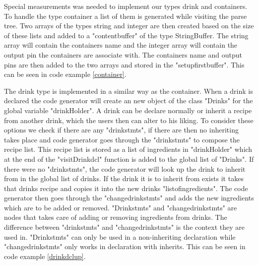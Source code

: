 
Special measurements was needed to implement our types drink and containers. To handle the type container a list of them is generated while visiting the parse tree. Two arrays of the types string and integer are then created based on the size of these lists and added to a "contentbuffer" of the type StringBuffer. The string array will contain the containers name and the integer array will contain the output pin the containers are associate with. The containers name and output pins are then added to the two arrays and stored in the "setupfirstbuffer". This can be seen in code example \ref{container}.


The drink type is implemented in a similar way as the container. When a drink is declared the code generator will create an new object of the class "Drinks" for the global variable "drinkHolder". A drink can be declare normally or inherit a recipe from another drink, which the users then can alter to his liking. To consider these options we check if there are any "drinkstmts", if there are then no inheriting takes place and code generator goes through the "drinkstmts" to compose the recipe list. This recipe list is stored as a list of ingredients in "drinkHolder" which at the end of the "visitDrinkdcl" function is added to the global list of "Drinks". If there were no "drinkstmts", the code generator will look up the drink to inherit from in the global list of drinks. If the drink it is to inherit from exists it takes that drinks recipe and copies it into the new drinks "listofingredients". The code generator then goes through the "changedrinkstmts" and adds the new ingredients which are to be added or removed. "Drinkstmts" and "changedrinkstmts" are nodes that takes care of adding or removing ingredients from drinks. The difference between "drinkstmts" and "changedrinkstmts" is the context they are used in. "Drinkstmts" can only be used in a non-inheriting declaration while "changedrinkstmts" only works in declaration with inherits. This can be seen in code example \ref{drinkdclup}.




